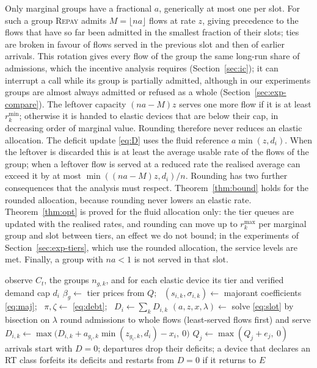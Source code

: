 \documentclass[preprint,11pt]{elsarticle}
\theoremstyle{definition}
\theoremstyle{remark}
\newcommand{\rmin}{r^{\min}}
\newcommand{\rmax}{r^{\max}}
\newcommand{\repay}{\textsc{Repay}}
\begin{document}
Only marginal groups have a fractional $a$, generically at most one per slot.
For such a group \repay{} admits $M=\lfloor n a\rfloor$ flows at rate $z$, giving precedence to the flows that have so far been admitted in the smallest fraction of their slots; ties are broken in favour of flows served in the previous slot and then of earlier arrivals.
This rotation gives every flow of the group the same long-run share of admissions, which the incentive analysis requires (Section~\ref{sec:ic}); it can interrupt a call while its group is partially admitted, although in our experiments groups are almost always admitted or refused as a whole (Section~\ref{sec:exp-compare}).
The leftover capacity $(na-M)z$ serves one more flow if it is at least $\rmin_k$; otherwise it is handed to elastic devices that are below their cap, in decreasing order of marginal value.
Rounding therefore never reduces an elastic allocation.
The deficit update \eqref{eq:D} uses the fluid reference $a\min(z,d_i)$. When the leftover is discarded this is at least the average usable rate of the flows of the group; when a leftover flow is served at a reduced rate the realised average can exceed it by at most $\min((na-M)z,d_i)/n$.
Rounding has two further consequences that the analysis must respect. Theorem~\ref{thm:bound} holds for the rounded allocation, because rounding never lowers an elastic rate. Theorem~\ref{thm:opt} is proved for the fluid allocation only: the tier queues are updated with the realised rates, and rounding can move up to $\rmax_k$ per marginal group and slot between tiers, an effect we do not bound; in the experiments of Section~\ref{sec:exp-tiers}, which use the rounded allocation, the service levels are met. Finally, a group with $na<1$ is not served in that slot.

\begin{algorithm}[t]
\caption{\repay{}, slot $t$}\label{alg:repay}
\begin{algorithmic}[1]
\State observe $C_t$, the groups $n_{g,k}$, and for each elastic device its tier and verified demand cap $d_i$
\State $\beta_g\gets$ tier prices from $Q$; \ $(s_{i,k},\sigma_{i,k})\gets$ majorant coefficients \eqref{eq:maj}; \ $\pi,\zeta\gets$ \eqref{eq:debt}; \ $D_i\gets\sum_kD_{i,k}$
\State $(a,z,x,\lambda)\gets$ solve \eqref{eq:slot} by bisection on $\lambda$
\State round admissions to whole flows (least-served flows first) and serve
 $D_{i,k}\gets\max\big(D_{i,k}+a_{g_i,k}\min(z_{g_i,k},d_i)-x_i,\ 0\big)$ \EndFor
{} $Q_j\gets\max(Q_j+e_j,\ 0)$ \EndFor
\State arrivals start with $D=0$; departures drop their deficits; a device that declares an RT class forfeits its deficits and restarts from $D=0$ if it returns to $E$
\end{algorithmic}
\end{algorithm}
\end{document}
